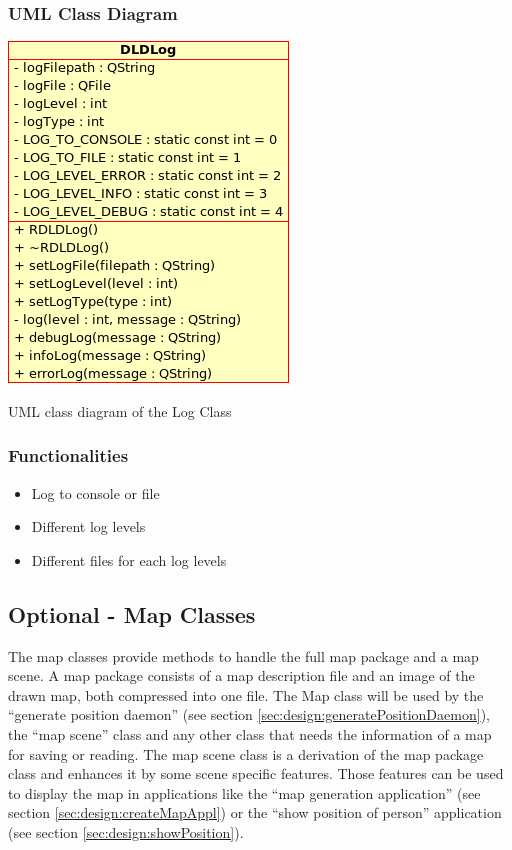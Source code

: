     \subsubsection{UML Class Diagram}
     \begin{staticFigure}
      \centering
      \includegraphics[scale=0.6]{UMLDiagrams/dldLog.png}
      \caption{UML class diagram of the Log Class}
      \label{fg:projectModularization:log}
     \end{staticFigure}

    \subsubsection{Functionalities}
     \begin{itemize}
      \item Log to console or file
      \item Different log levels
      \item Different files for each log levels
     \end{itemize}

   \subsection{Optional - Map Classes}
    \label{sec:design:map}
    The map classes provide methods to handle the full map package and a map scene. A map package consists of a map description file and an image of the drawn map, both compressed into one file. The Map class will be used by the ``generate position daemon'' (see section \ref{sec:design:generatePositionDaemon}), the ``map scene'' class and any other class that needs the information of a map for saving or reading. The map scene class is a derivation of the map package class and enhances it by some scene specific features. Those features can be used to display the map in applications like the ``map generation application'' (see section  \ref{sec:design:createMapAppl}) or the ``show position of person'' application (see section  \ref{sec:design:showPosition}).

